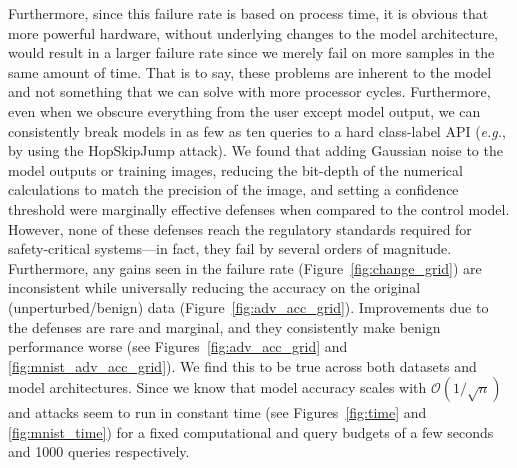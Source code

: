 \documentclass[lettersize,journal]{IEEEtran}
\newcommand{\eg}{\textit{e.g.}\xspace}
\begin{document}
Furthermore, since this failure rate is based on process time, it is obvious that more powerful hardware, without underlying changes to the model architecture, would result in a larger failure rate since we merely fail on more samples in the same amount of time. That is to say, these problems are inherent to the model and not something that we can solve with more processor cycles. Furthermore, even when we obscure everything from the user except model output, we can consistently break models in as few as ten queries to a hard class-label API (\eg, by using the HopSkipJump attack). We found that adding Gaussian noise to the model outputs or training images, reducing the bit-depth of the numerical calculations to match the precision of the image, and setting a confidence threshold were marginally effective defenses when compared to the control model. However, none of these defenses reach the regulatory standards required for safety-critical systems---in fact, they fail by several orders of magnitude. Furthermore, any gains seen in the failure rate (Figure~\ref{fig:change_grid}) are inconsistent while universally reducing the accuracy on the original (unperturbed/benign) data (Figure~\ref{fig:adv_acc_grid}). Improvements due to the defenses are rare and marginal, and they consistently make benign performance worse (see Figures~\ref{fig:adv_acc_grid} and \ref{fig:mnist_adv_acc_grid}). We find this to be true across both datasets and model architectures. Since we know that model accuracy scales with $\mathcal{O}(1/\sqrt{n})$~\cite{vapnik1994measuring} and attacks seem to run in constant time (see Figures~\ref{fig:time} and \ref{fig:mnist_time}) for a fixed computational and query budgets of a few seconds and 1000 queries respectively.

\end{document}

